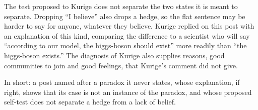 \begin{afterword}
The test proposed to Kurige does not separate the two states it is meant to separate. Dropping ``I believe'' also drops a hedge, so the flat sentence may be harder to say for anyone, whatever they believe. Kurige replied on this post with an explanation of this kind, comparing the difference to a scientist who will say ``according to our model, the higgs-boson should exist'' more readily than ``the higgs-boson exists.'' The diagnosis of Kurige also supplies reasons, good communities to join and good feelings, that Kurige's comment did not give.

In short: a post named after a paradox it never states, whose explanation, if right, shows that its case is not an instance of the paradox, and whose proposed self-test does not separate a hedge from a lack of belief.
\end{afterword}
